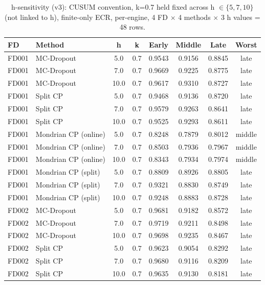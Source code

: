 \begin{table}[t]
\caption{h-sensitivity (v3): CUSUM convention, k=0.7 held fixed across h $\in \{5, 7, 10\}$ (not linked to h), finite-only ECR, per-engine, 4 FD $\times$ 4 methods $\times$ 3 h values = 48 rows.}
\label{tab:h-sensitivity-v4}
\centering
\small
\begin{tabular}{llcccccc}
\toprule
FD & Method & h & k & Early & Middle & Late & Worst \\
\midrule
FD001 & MC-Dropout & 5.0 & 0.7 & 0.9543 & 0.9156 & 0.8845 & late \\
FD001 & MC-Dropout & 7.0 & 0.7 & 0.9669 & 0.9225 & 0.8775 & late \\
FD001 & MC-Dropout & 10.0 & 0.7 & 0.9617 & 0.9310 & 0.8727 & late \\
FD001 & Split CP & 5.0 & 0.7 & 0.9468 & 0.9136 & 0.8720 & late \\
FD001 & Split CP & 7.0 & 0.7 & 0.9579 & 0.9263 & 0.8641 & late \\
FD001 & Split CP & 10.0 & 0.7 & 0.9525 & 0.9293 & 0.8611 & late \\
FD001 & Mondrian CP (online) & 5.0 & 0.7 & 0.8248 & 0.7879 & 0.8012 & middle \\
FD001 & Mondrian CP (online) & 7.0 & 0.7 & 0.8503 & 0.7936 & 0.7967 & middle \\
FD001 & Mondrian CP (online) & 10.0 & 0.7 & 0.8343 & 0.7934 & 0.7974 & middle \\
FD001 & Mondrian CP (split) & 5.0 & 0.7 & 0.8809 & 0.8926 & 0.8805 & late \\
FD001 & Mondrian CP (split) & 7.0 & 0.7 & 0.9321 & 0.8830 & 0.8749 & late \\
FD001 & Mondrian CP (split) & 10.0 & 0.7 & 0.9248 & 0.8883 & 0.8728 & late \\
FD002 & MC-Dropout & 5.0 & 0.7 & 0.9681 & 0.9182 & 0.8572 & late \\
FD002 & MC-Dropout & 7.0 & 0.7 & 0.9719 & 0.9211 & 0.8498 & late \\
FD002 & MC-Dropout & 10.0 & 0.7 & 0.9698 & 0.9235 & 0.8467 & late \\
FD002 & Split CP & 5.0 & 0.7 & 0.9623 & 0.9054 & 0.8292 & late \\
FD002 & Split CP & 7.0 & 0.7 & 0.9680 & 0.9116 & 0.8209 & late \\
FD002 & Split CP & 10.0 & 0.7 & 0.9635 & 0.9130 & 0.8181 & late \\

\end{tabular}
\end{table}
